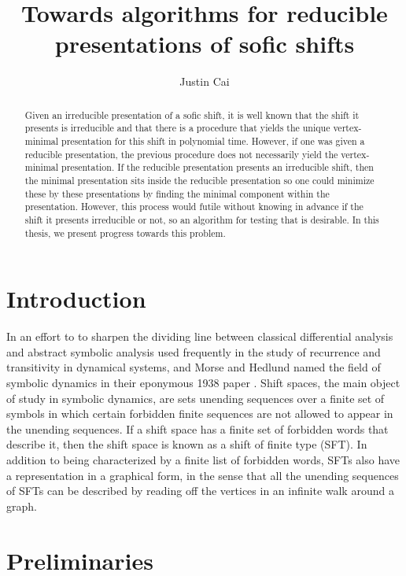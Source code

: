 \documentclass[hidelinks]{article}
\title{Towards algorithms for reducible presentations of sofic shifts}
\author{Justin Cai}
\theoremstyle{definition}
\begin{document}
\maketitle

\begin{abstract}
    Given an irreducible presentation of a sofic shift, it is well known that the 
    shift it presents is irreducible and that there is a 
    procedure that yields the unique vertex-minimal presentation for
    this shift in polynomial time. However, if one was given a reducible presentation,
    the previous procedure does not necessarily yield the vertex-minimal presentation.
    If the reducible presentation presents an irreducible shift, 
    then the minimal presentation sits inside the reducible presentation 
    so one could minimize these by these presentations by finding the 
    minimal component within the presentation. However, this process 
    would futile without knowing in advance if the shift it presents 
    irreducible or not, so an algorithm for testing that is desirable. 
    In this thesis, we present progress towards this problem.
\end{abstract}

\section{Introduction}

In an effort to to sharpen the dividing 
line between classical differential analysis and abstract symbolic analysis
used frequently in the study of recurrence and transitivity in dynamical systems, 
and Morse and Hedlund named the field of symbolic dynamics in their eponymous 
1938 paper \cite{morse1938symbolic}. Shift spaces, the main object 
of study in symbolic dynamics, are sets unending sequences over a finite set of 
symbols in which certain forbidden finite sequences are not allowed to appear 
in the unending sequences. If a shift space has a finite set of 
forbidden words that describe it, then the shift space is known as a shift 
of finite type (SFT). In addition to being characterized by a 
finite list of forbidden words, SFTs also have a representation in a graphical 
form, in the sense that all the unending sequences of SFTs can be 
described by reading off the vertices in an infinite walk around a graph.


\section{Preliminaries}
\end{document}
